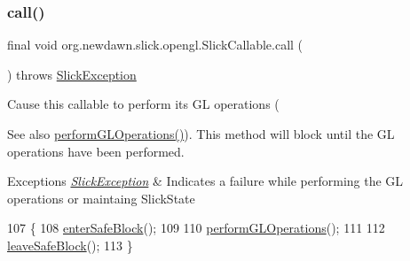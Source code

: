 \subsubsection{\texorpdfstring{call()}{call()}}
{\footnotesize\ttfamily final void org.\+newdawn.\+slick.\+opengl.\+Slick\+Callable.\+call (\begin{DoxyParamCaption}{ }\end{DoxyParamCaption}) throws \mbox{\hyperlink{classorg_1_1newdawn_1_1slick_1_1_slick_exception}{Slick\+Exception}}\hspace{0.3cm}{\ttfamily [inline]}}

Cause this callable to perform it\textquotesingle{}s GL operations (\begin{DoxySeeAlso}{See also}
\mbox{\hyperlink{classorg_1_1newdawn_1_1slick_1_1opengl_1_1_slick_callable_aa7b2c33eb1b68c7203cc9abdf6b33fc6}{perform\+G\+L\+Operations()}}). This method will block until the GL operations have been performed.
\end{DoxySeeAlso}

\begin{DoxyExceptions}{Exceptions}
{\em \mbox{\hyperlink{classorg_1_1newdawn_1_1slick_1_1_slick_exception}{Slick\+Exception}}} & Indicates a failure while performing the GL operations or maintaing Slick\+State \\
\hline
\end{DoxyExceptions}

\begin{DoxyCode}
107                                                    \{
108         \mbox{\hyperlink{classorg_1_1newdawn_1_1slick_1_1opengl_1_1_slick_callable_a7a7a650d0708c6360dfd3e2a59d99828}{enterSafeBlock}}();
109         
110         \mbox{\hyperlink{classorg_1_1newdawn_1_1slick_1_1opengl_1_1_slick_callable_aa7b2c33eb1b68c7203cc9abdf6b33fc6}{performGLOperations}}();
111         
112         \mbox{\hyperlink{classorg_1_1newdawn_1_1slick_1_1opengl_1_1_slick_callable_acfce604d621582d39c7466096f46af47}{leaveSafeBlock}}();
113     \}
\end{DoxyCode}
\mbox{\label{classorg_1_1newdawn_1_1slick_1_1opengl_1_1_slick_callable_a7a7a650d0708c6360dfd3e2a59d99828}} 

